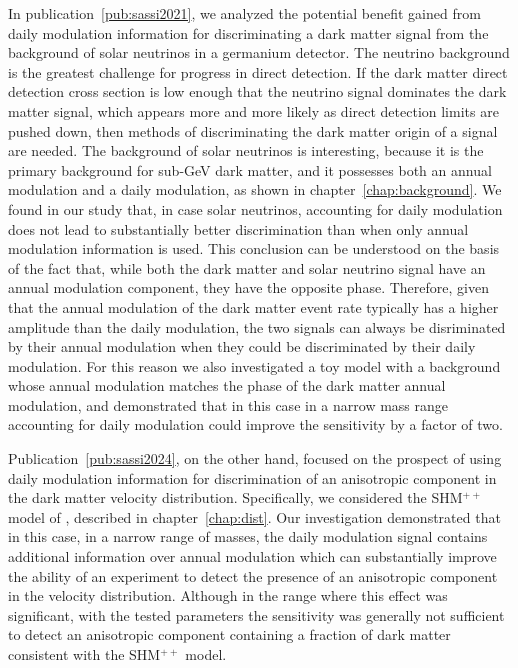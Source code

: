 \documentclass[b5paper, 10pt, twoside]{book}
\begin{document}
In publication~\ref{pub:sassi2021}, we analyzed the potential benefit gained from daily modulation information for discriminating a dark matter signal from the background of solar neutrinos in a germanium detector. The neutrino background is the greatest challenge for progress in direct detection. If the dark matter direct detection cross section is low enough that the neutrino signal dominates the dark matter signal, which appears more and more likely as direct detection limits are pushed down, then methods of discriminating the dark matter origin of a signal are needed. The background of solar neutrinos is interesting, because it is the primary background for sub-GeV dark matter, and it possesses both an annual modulation and a daily modulation, as shown in chapter~\ref{chap:background}. We found in our study that, in case solar neutrinos, accounting for daily modulation does not lead to substantially better discrimination than when only annual modulation information is used. This conclusion can be understood on the basis of the fact that, while both the dark matter and solar neutrino signal have an annual modulation component, they have the opposite phase. Therefore, given that the annual modulation of the dark matter event rate typically has a higher amplitude than the daily modulation, the two signals can always be disriminated by their annual modulation when they could be discriminated by their daily modulation. For this reason we also investigated a toy model with a background whose annual modulation matches the phase of the dark matter annual modulation, and demonstrated that in this case in a narrow mass range accounting for daily modulation could improve the sensitivity by a factor of two.

Publication~\ref{pub:sassi2024}, on the other hand, focused on the prospect of using daily modulation information for discrimination of an anisotropic component in the dark matter velocity distribution. Specifically, we considered the SHM$^{++}$ model of \textcite{EvansOHareMcCabe2019}, described in chapter~\ref{chap:dist}. Our investigation demonstrated that in this case, in a narrow range of masses, the daily modulation signal contains additional information over annual modulation which can substantially improve the ability of an experiment to detect the presence of an anisotropic component in the velocity distribution. Although in the range where this effect was significant, with the tested parameters the sensitivity was generally not sufficient to detect an anisotropic component containing a fraction of dark matter consistent with the SHM$^{++}$ model.
\end{document}
